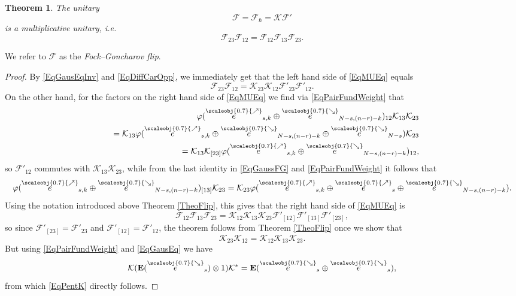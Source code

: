 \documentclass[11pt, reqno]{amsart}
\newtheorem{theorem}{Theorem}[section]
\theoremstyle{definition}
\numberwithin{equation}{section}
\def\Fc{\mathcal F'}
\newcommand{\eb}{\mathbf{E}}
\newcommand{\Kc}{\mathcal{K}}
\newcommand{\Fct}{\mathcal{F}}
\newcommand{\nears}{\scaleobj{0.7}{\nearrow}}
\newcommand{\sears}{\scaleobj{0.7}{\searrow}}
\newcommand{\nee}{\overset{\nears}{e}}
\newcommand{\seee}{\overset{\sears}{e}}
\newcommand{\Eb}{\mathbf{E}}
\begin{document}
\begin{theorem}
The unitary
\begin{equation}\label{EqRealMU}
\Fct = \Fct_{\hbar} = \Kc\Fc
\end{equation}
is a multiplicative unitary, i.e.\ 
\begin{equation}\label{EqMUEq}
\Fct_{23}\Fct_{12} = \Fct_{12}\Fct_{13}\Fct_{23}.
\end{equation}
\end{theorem}
We refer to $\Fct$ as the \emph{Fock--Goncharov flip}. 
\begin{proof}
By \eqref{EqGausEqInv} and \eqref{EqDiffCarOpp}, we immediately get that the left hand side of \eqref{EqMUEq} equals
\[
\Fct_{23}\Fct_{12}  = \Kc_{23}\Kc_{12} \Fc_{23}\Fc_{12}. 
\]
On the other hand, for the factors on the right hand side of \eqref{EqMUEq} we find via \eqref{EqPairFundWeight} that
\begin{eqnarray*}
&& \hspace{-2cm} \varphi(\nee_{s,k}\oplus \seee_{N-s,(n-r)-k})_{12} \Kc_{13}\Kc_{23}\\  &&  = \Kc_{13}  \varphi(\nee_{s,k}\oplus \seee_{N-s,(n-r)-k}\oplus \seee_{N-s})\Kc_{23} \\
&& = \Kc_{13}\Kc_{[23]}\varphi(\nee_{s,k}\oplus \seee_{N-s,(n-r)-k})_{12},
\end{eqnarray*}
so $\Fc_{12}$ commutes with $\Kc_{13}\Kc_{23}$, while  from the last identity in \eqref{EqGaussFG} and \eqref{EqPairFundWeight} it follows that
\[
\varphi(\nee_{s,k}\oplus \seee_{N-s,(n-r)-k})_{[13]}\Kc_{23} = \Kc_{23} \varphi(\nee_{s,k}\oplus \nee_s \oplus \seee_{N-s,(n-r)-k}).
\]
Using the notation introduced above Theorem \ref{TheoFlip}, this gives that the right hand side of \eqref{EqMUEq} is 
\[
\Fct_{12}\Fct_{13}\Fct_{23} =  \Kc_{12}\Kc_{13}\Kc_{23} \Fc_{[12]}\Fc_{[13]}\Fc_{[23]},
\]
so since $\Fc_{[23]} = \Fc_{23}$ and $\Fc_{[12]} = \Fc_{12}$, the theorem follows from Theorem \ref{TheoFlip} once we show that
\begin{equation}\label{EqPentK}
\Kc_{23}\Kc_{12} = \Kc_{12}\Kc_{13}\Kc_{23}.
\end{equation}
But using \eqref{EqPairFundWeight} and \eqref{EqGausEq}  we have 
\[
\Kc (\eb(\seee_{s})\otimes 1)\Kc^* = \Eb(\seee_s\oplus \seee_s), 
\]
from which \eqref{EqPentK} directly follows.
\end{proof}
\end{document}
